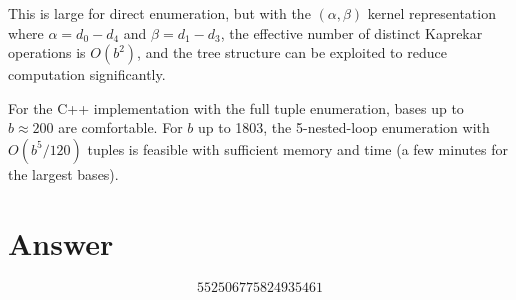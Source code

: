 \documentclass[11pt,a4paper]{article}
\begin{document}
This is large for direct enumeration, but with the $(\alpha, \beta)$ kernel representation where $\alpha = d_0 - d_4$ and $\beta = d_1 - d_3$, the effective number of distinct Kaprekar operations is $O(b^2)$, and the tree structure can be exploited to reduce computation significantly.

For the C++ implementation with the full tuple enumeration, bases up to $b \approx 200$ are comfortable. For $b$ up to 1803, the 5-nested-loop enumeration with $O(b^5/120)$ tuples is feasible with sufficient memory and time (a few minutes for the largest bases).

\section{Answer}

\[
\boxed{552506775824935461}
\]
\end{document}
